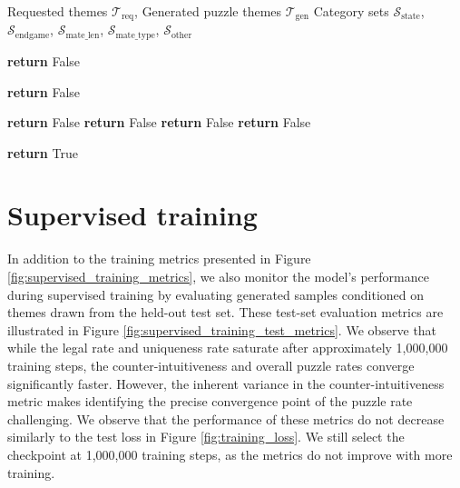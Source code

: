 \begin{algorithm}[H]
    \caption{Themes match}
    \label{alg:theme match}
    \begin{algorithmic}
        \Require Requested themes $\mathcal{T}_{\text{req}}$, Generated puzzle themes $\mathcal{T}_{\text{gen}}$
        \Require Category sets $\mathcal{S}_{\text{state}}$, $\mathcal{S}_{\text{endgame}}$, $\mathcal{S}_{\text{mate\_len}}$, $\mathcal{S}_{\text{mate\_type}}$, $\mathcal{S}_{\text{other}}$
        
            \State \textbf{return} False
        \EndIf
        
                \State \textbf{return} False
            \EndIf
        \EndIf
        
                \State \textbf{return} False
            \EndIf
                \State \textbf{return} False
            \EndIf
                \State \textbf{return} False
            \EndIf
        \Else
                \State \textbf{return} False
            \EndIf
        \EndIf
        
        \State \textbf{return} True
    \end{algorithmic}
\end{algorithm}




\section{Supervised training}


In addition to the training metrics presented in Figure \ref{fig:supervised_training_metrics}, we also monitor the model's performance during supervised training by evaluating generated samples conditioned on themes drawn from the held-out test set. These test-set evaluation metrics are illustrated in Figure \ref{fig:supervised_training_test_metrics}. We observe that while the legal rate and uniqueness rate saturate after approximately 1,000,000 training steps, the counter-intuitiveness and overall puzzle rates converge significantly faster. However, the inherent variance in the counter-intuitiveness metric makes identifying the precise convergence point of the puzzle rate challenging. We observe that the performance of these metrics do not decrease similarly to the test loss in Figure \ref{fig:training_loss}. We still select the checkpoint at 1,000,000 training steps, as the metrics do not improve with more training.

